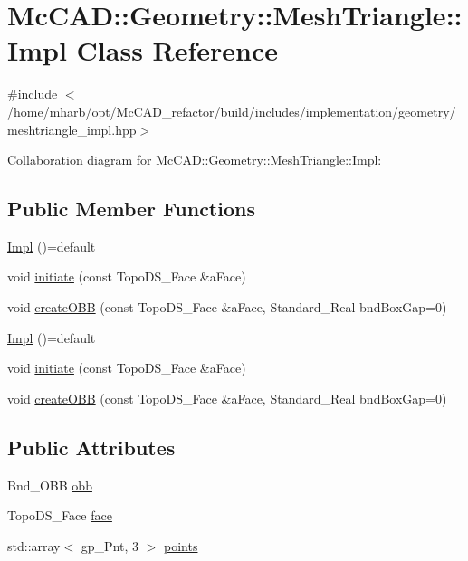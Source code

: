 \hypertarget{classMcCAD_1_1Geometry_1_1MeshTriangle_1_1Impl}{}\section{Mc\+C\+AD\+:\+:Geometry\+:\+:Mesh\+Triangle\+:\+:Impl Class Reference}
\label{classMcCAD_1_1Geometry_1_1MeshTriangle_1_1Impl}


{\ttfamily \#include $<$/home/mharb/opt/\+Mc\+C\+A\+D\+\_\+refactor/build/includes/implementation/geometry/meshtriangle\+\_\+impl.\+hpp$>$}



Collaboration diagram for Mc\+C\+AD\+:\+:Geometry\+:\+:Mesh\+Triangle\+:\+:Impl\+:
\subsection*{Public Member Functions}
\begin{DoxyCompactItemize}
\item 
\hyperlink{classMcCAD_1_1Geometry_1_1MeshTriangle_1_1Impl_a2cda2d8a8381100fb063469a8e425cfa}{Impl} ()=default
\item 
void \hyperlink{classMcCAD_1_1Geometry_1_1MeshTriangle_1_1Impl_ae464fdf11ea0856674726c59760f423e}{initiate} (const Topo\+D\+S\+\_\+\+Face \&a\+Face)
\item 
void \hyperlink{classMcCAD_1_1Geometry_1_1MeshTriangle_1_1Impl_a6fb5eafd5e28695aacedc93bdd9b7da3}{create\+O\+BB} (const Topo\+D\+S\+\_\+\+Face \&a\+Face, Standard\+\_\+\+Real bnd\+Box\+Gap=0)
\item 
\hyperlink{classMcCAD_1_1Geometry_1_1MeshTriangle_1_1Impl_a2cda2d8a8381100fb063469a8e425cfa}{Impl} ()=default
\item 
void \hyperlink{classMcCAD_1_1Geometry_1_1MeshTriangle_1_1Impl_ae464fdf11ea0856674726c59760f423e}{initiate} (const Topo\+D\+S\+\_\+\+Face \&a\+Face)
\item 
void \hyperlink{classMcCAD_1_1Geometry_1_1MeshTriangle_1_1Impl_a6fb5eafd5e28695aacedc93bdd9b7da3}{create\+O\+BB} (const Topo\+D\+S\+\_\+\+Face \&a\+Face, Standard\+\_\+\+Real bnd\+Box\+Gap=0)
\end{DoxyCompactItemize}
\subsection*{Public Attributes}
\begin{DoxyCompactItemize}
\item 
Bnd\+\_\+\+O\+BB \hyperlink{classMcCAD_1_1Geometry_1_1MeshTriangle_1_1Impl_a1b7bcf68b5df6bca6d87f674eb048a4d}{obb}
\item 
Topo\+D\+S\+\_\+\+Face \hyperlink{classMcCAD_1_1Geometry_1_1MeshTriangle_1_1Impl_a628b32616a5686ef5a83b90ac5bfc2b1}{face}
\item 
std\+::array$<$ gp\+\_\+\+Pnt, 3 $>$ \hyperlink{classMcCAD_1_1Geometry_1_1MeshTriangle_1_1Impl_ab03401cf518b9b9576fdf1807a1db4bc}{points}
\end{DoxyCompactItemize}



